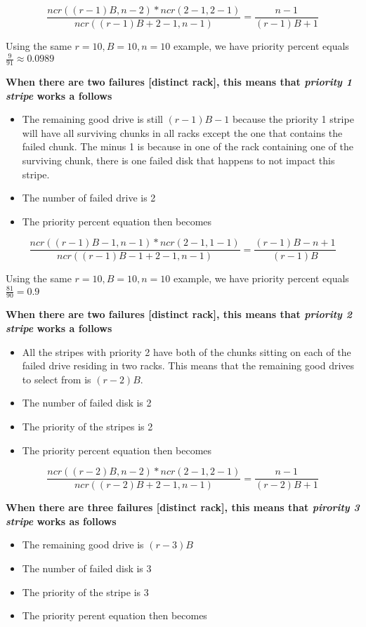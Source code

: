 \documentclass[journal]{IEEEtran}
\begin{document}
\begin{equation*}
  \frac{ncr((r-1)B, n-2)*ncr(2-1, 2-1)}{ncr((r-1)B+2-1, n-1)}=\frac{n-1}{(r-1)B+1}
\end{equation*}

Using the same $r=10, B=10, n=10$ example, we have priority percent equals $\frac{9}{91}\approx 0.0989$


\textbf{When there are two failures [distinct rack], this means that \textit{priority 1 stripe} works a follows}
\begin{itemize}
  \item The remaining good drive is still $(r-1)B-1$ because the priority 1 stripe will have all surviving chunks in all racks except the one that contains the failed chunk. The minus 1 is because in one of the rack containing one of the surviving chunk, there is one failed disk that happens to not impact this stripe.
  \item The number of failed drive is 2
  \item The priority percent equation then becomes
\end{itemize}

\begin{equation*}
  \frac{ncr((r-1)B-1, n-1)*ncr(2-1, 1-1)}{ncr((r-1)B-1+2-1, n-1)}=\frac{(r-1)B-n+1}{(r-1)B}
\end{equation*}

Using the same $r=10, B=10, n=10$ example, we have priority percent equals $\frac{81}{90}=0.9$

\textbf{When there are two failures [distinct rack], this means that \textit{priority 2 stripe} works a follows}
\begin{itemize}
  \item All the stripes with priority 2 have both of the chunks sitting on each of the failed drive residing in two racks. This means that the remaining good drives to select from is $(r-2)B$.
  \item The number of failed disk is 2
  \item The priority of the stripes is 2
  \item The priority percent equation then becomes
\end{itemize}

\begin{equation*}
  \frac{ncr((r-2)B, n-2)*ncr(2-1, 2-1)}{ncr((r-2)B+2-1, n-1)}=\frac{n-1}{(r-2)B+1}
\end{equation*}

\textbf{When there are three failures [distinct rack], this means that \textit{pirority 3 stripe} works as follows}
\begin{itemize}
  \item The remaining good drive is $(r-3)B$
  \item The number of failed disk is 3
  \item The priority of the stripe is 3
  \item The priority perent equation then becomes
\end{itemize}
\end{document}
